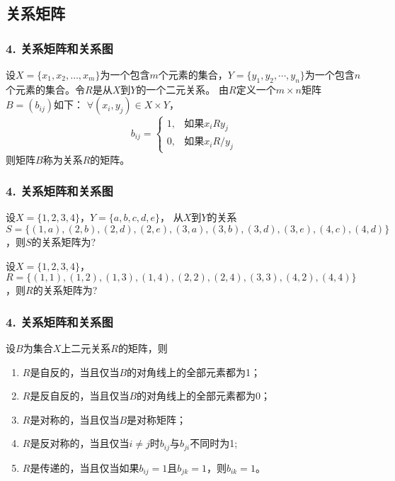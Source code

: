 \documentclass{beamer}
\begin{document}
\begin{CJK*}{UTF8}{gbsn}
\section{关系矩阵}
\begin{frame}
  \frametitle{4. 关系矩阵和关系图}
  \begin{Def}\justifying\let\raggedright\justifying
    设$X=\{x_1, x_2, \ldots, x_m\}$为一个包含$m$个元素的集合，$Y=\{y_1, y_2,
    \cdots, y_n\}$为一个包含$n$个元素的集合。令$R$是从$X$到$Y$的一个二元关系。
    由$R$定义一个$m \times n$矩阵$B = (b_{ij})$如下： $\forall (x_i, y_j) \in X \times Y$，
\[
    b_{ij}=
      \begin{cases}
        1,&\text{如果}x_iRy_j\\
        0,&\text{如果}x_iR\!\!\! / y_j
      \end{cases}
\]
    则矩阵$B$称为关系$R$的矩阵。
  \end{Def}
\end{frame}
\begin{frame}
  \frametitle{4. 关系矩阵和关系图}
  \begin{Ex}
    设$X=\{1,2,3,4\}$，$Y=\{a, b, c, d, e\}$， 从$X$到$Y$的关系$S=\{(1,a),  (2, b), (2, d), (2, e), (3, a), (3, b), (3, d),  (3, e), (4,c), (4,d)\}$，则$S$的关系矩阵为?
  \end{Ex}
  \pause
  \begin{Ex}
    设$X = \{1,2,3,4\}$，$R = \{(1,1),(1,2),(1,3),(1,4),(2,2),(2,4),(3,3),(4,2),(4,4)\}$，则$R$的关系矩阵为?
  \end{Ex}
\end{frame}
\begin{frame}
  \frametitle{4. 关系矩阵和关系图}
  \begin{Thm}
  设$B$为集合$X$上二元关系$R$的矩阵，则
  \begin{enumerate}[(1)]
  \item $R$是自反的，当且仅当$B$的对角线上的全部元素都为1；
  \item $R$是反自反的，当且仅当$B$的对角线上的全部元素都为0；
  \item $R$是对称的，当且仅当$B$是对称矩阵；
  \item $R$是反对称的，当且仅当$i \neq j$时$b_{ij}$与$b_{ji}$不同时为1;
  \item $R$是传递的，当且仅当如果$b_{ij}=1$且$b_{jk}=1$，则$b_{ik}=1$。
  \end{enumerate}
\end{Thm}
\end{frame}
\begin{frame}

\end{frame}
\end{CJK*}
\end{document}
